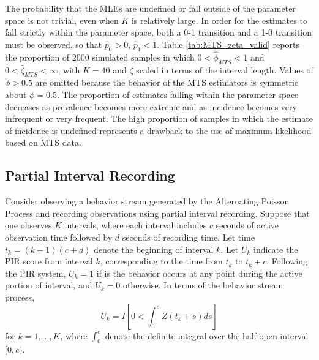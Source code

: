 \documentclass[man, noextraspace, floatsintext]{apa6}\usepackage[]{graphicx}\usepackage[]{color}
\begin{document}
The probability that the MLEs are undefined or fall outside of the parameter space is not trivial, even when $K$ is relatively large. 
In order for the estimates to fall strictly within the parameter space, both a 0-1 transition and a 1-0 transition must be observed, so that $\hat{p}_0 > 0$, $\hat{p}_1 < 1$. Table \ref{tab:MTS_zeta_valid} reports the proportion of 2000 simulated samples in which $0 < \hat\phi_{MTS} < 1$ and $0 < \hat\zeta_{MTS} < \infty$, with $K = 40$ and $\zeta$ scaled in terms of the interval length. 
Values of $\phi > 0.5$ are omitted because the behavior of the MTS estimators is symmetric about $\phi = 0.5$. 
The proportion of estimates falling within the parameter space decreases as prevalence becomes more extreme and as incidence becomes very infrequent or very frequent. 
The high proportion of samples in which the estimate of incidence is undefined represents a drawback to the use of maximum likelihood based on MTS data.

\subsection{Partial Interval Recording}
\label{subsec:PIR}

Consider observing a behavior stream generated by the Alternating Poisson Process and recording observations using partial interval recording. 
Suppose that one observes $K$ intervals, where each interval includes $c$ seconds of active observation time followed by $d$ seconds of recording time. 
Let time $t_k = (k-1)(c + d)$ denote the beginning of interval $k$. Let $U_k$ indicate the PIR score from interval $k$, corresponding to the time from $t_k$ to $t_k + c$. 
Following the PIR system, $U_k = 1$ if is the behavior occurs at any point during the active portion of interval, and $U_k = 0$ otherwise. 
In terms of the behavior stream process, 
\begin{equation}
U_k = I\left[ 0 < \int_0^c Z\left(t_k + s \right) ds\right]
\end{equation}
for $k = 1,...,K$, where $\int_0^c$ denote the definite integral over the half-open interval $[0,c)$.
\end{document}
